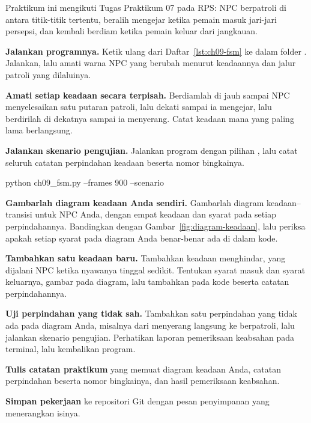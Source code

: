 \begin{praktikumbox}
Praktikum ini mengikuti Tugas Praktikum 07 pada RPS: NPC berpatroli di antara
titik-titik tertentu, beralih mengejar ketika pemain masuk jari-jari persepsi,
dan kembali berdiam ketika pemain keluar dari jangkauan.

\begin{langkah}
  \item \textbf{Jalankan programnya.} Ketik ulang  dari
        Daftar~\ref{lst:ch09-fsm} ke dalam folder . Jalankan, lalu
        amati warna NPC yang berubah menurut keadaannya dan jalur patroli yang
        dilaluinya.

  \item \textbf{Amati setiap keadaan secara terpisah.} Berdiamlah di jauh
        sampai NPC menyelesaikan satu putaran patroli, lalu dekati sampai ia
        mengejar, lalu berdirilah di dekatnya sampai ia menyerang. Catat
        keadaan mana yang paling lama berlangsung.

  \item \textbf{Jalankan skenario pengujian.} Jalankan program dengan pilihan
        , lalu catat seluruh catatan perpindahan keadaan
        beserta nomor bingkainya.
\begin{kodekeluaran}
python ch09_fsm.py --frames 900 --scenario
\end{kodekeluaran}

  \item \textbf{Gambarlah diagram keadaan Anda sendiri.} Gambarlah diagram
        keadaan--transisi untuk NPC Anda, dengan empat keadaan dan syarat pada
        setiap perpindahannya. Bandingkan dengan
        Gambar~\ref{fig:diagram-keadaan}, lalu periksa apakah setiap syarat
        pada diagram Anda benar-benar ada di dalam kode.

  \item \textbf{Tambahkan satu keadaan baru.} Tambahkan keadaan menghindar,
        yang dijalani NPC ketika nyawanya tinggal sedikit. Tentukan syarat
        masuk dan syarat keluarnya, gambar pada diagram, lalu tambahkan pada
        kode beserta catatan perpindahannya.

  \item \textbf{Uji perpindahan yang tidak sah.} Tambahkan satu perpindahan
        yang tidak ada pada diagram Anda, misalnya dari menyerang langsung ke
        berpatroli, lalu jalankan skenario pengujian. Perhatikan laporan
        pemeriksaan keabsahan pada terminal, lalu kembalikan program.

  \item \textbf{Tulis catatan praktikum} yang memuat diagram keadaan Anda,
        catatan perpindahan beserta nomor bingkainya, dan hasil pemeriksaan
        keabsahan.

  \item \textbf{Simpan pekerjaan} ke repositori Git dengan pesan penyimpanan
        yang menerangkan isinya.
\end{langkah}
\end{praktikumbox}

